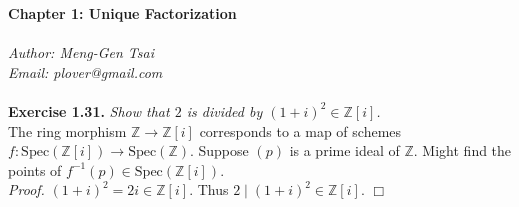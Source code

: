 \documentclass{article}
\begin{document}
\textbf{\Large Chapter 1: Unique Factorization} \\\\



\emph{Author: Meng-Gen Tsai} \\
\emph{Email: plover@gmail.com} \\\\




\textbf{Exercise 1.31.}
\emph{Show that $2$ is divided by $(1+i)^2 \in \mathbb{Z}[i]$.} \\

The ring morphism $\mathbb{Z} \rightarrow \mathbb{Z}[i]$
corresponds to a map of schemes
$f: \text{Spec}(\mathbb{Z}[i]) \rightarrow \text{Spec}(\mathbb{Z})$.
Suppose $(p)$ is a prime ideal of $\mathbb{Z}$.
Might find the points of $f^{-1}(p) \in \text{Spec}(\mathbb{Z}[i])$. \\

\emph{Proof.}
$(1+i)^2 = 2i \in \mathbb{Z}[i]$. Thus $2 \mid (1+i)^2 \in \mathbb{Z}[i]$.
$\Box$ \\\\
\end{document}
